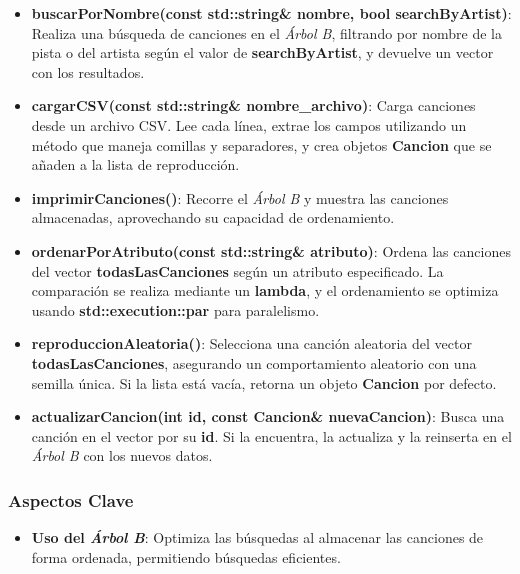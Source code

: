 \documentclass[corference]{IEEEtran}
\begin{document}
\begin{flushleft}
\begin{itemize}[left=4em]
                    \item \textbf{buscarPorNombre(const std::string\& nombre, bool searchByArtist)}: Realiza una búsqueda de canciones en el \textit{Árbol B}, filtrando por nombre de la pista o del artista según el valor de \textbf{searchByArtist}, y devuelve un vector con los resultados.
                
                    \item \textbf{cargarCSV(const std::string\& nombre\_archivo)}: Carga canciones desde un archivo CSV. Lee cada línea, extrae los campos utilizando un método que maneja comillas y separadores, y crea objetos \textbf{Cancion} que se añaden a la lista de reproducción.
                
                    \item \textbf{imprimirCanciones()}: Recorre el \textit{Árbol B} y muestra las canciones almacenadas, aprovechando su capacidad de ordenamiento.
                
                    \item \textbf{ordenarPorAtributo(const std::string\& atributo)}: Ordena las canciones del vector \textbf{todasLasCanciones} según un atributo especificado. La comparación se realiza mediante un \textbf{lambda}, y el ordenamiento se optimiza usando \textbf{std::execution::par} para paralelismo.
                
                    \item \textbf{reproduccionAleatoria()}: Selecciona una canción aleatoria del vector \textbf{todasLasCanciones}, asegurando un comportamiento aleatorio con una semilla única. Si la lista está vacía, retorna un objeto \textbf{Cancion} por defecto.
                
                    \item \textbf{actualizarCancion(int id, const Cancion\& nuevaCancion)}: Busca una canción en el vector por su \textbf{id}. Si la encuentra, la actualiza y la reinserta en el \textit{Árbol B} con los nuevos datos.
                \end{itemize}
            
            \subsubsection{Aspectos Clave}
            
                \begin{itemize}[left=4em]
                
                    \item \textbf{Uso del \textit{Árbol B}}: Optimiza las búsquedas al almacenar las canciones de forma ordenada, permitiendo búsquedas eficientes.
                    

\end{itemize}
\end{flushleft}
\end{document}
